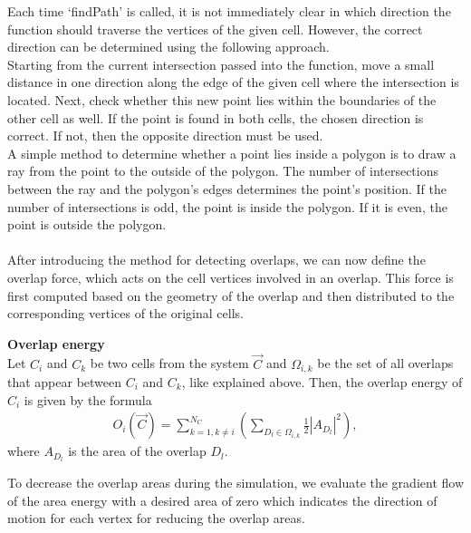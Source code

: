 Each time `findPath' is called, it is not immediately clear in which direction the function should traverse the vertices of the given cell. 
However, the correct direction can be determined using the following approach. \\
Starting from the current intersection passed into the function, move a small distance in one direction along the edge of the given cell where the intersection is located. Next, check whether this new point lies within the boundaries of the other cell as well. 
If the point is found in both cells, the chosen direction is correct. 
If not, then the opposite direction must be used. \\ 
A simple method to determine whether a point lies inside a polygon is to draw a ray from the point to the outside of the polygon. 
The number of intersections between the ray and the polygon's edges determines the point's position. 
If the number of intersections is odd, the point is inside the polygon.
If it is even, the point is outside the polygon. \\ 
\smallskip  \\
After introducing the method for detecting overlaps, we can now define the overlap force, which acts on the cell vertices involved in an overlap. 
This force is first computed based on the geometry of the overlap and then distributed to the corresponding vertices of the original cells. 

\begin{definition} \textbf{Overlap energy} \\
	Let $C_i$ and $C_k$ be two cells from the system $\vec{C}$ and $\Omega_{i,k}$ be the set of all overlaps that appear between $C_i$ and $C_k$, like explained above. Then, the overlap energy of $C_i$ is given by the formula 
	\begin{align}
		O_i(\vec{C}) = \sum\limits_{k=1, k \neq i}^{N_C} (\sum\limits_{D_l \in \Omega_{i,k}} \frac{1}{2}|A_{D_l}|^2),		
	\end{align} 
	where $A_{D_l}$ is the area of the overlap $D_l$.  \\
\end{definition}

To decrease the overlap areas during the simulation, we evaluate the gradient flow of the area energy with a desired area of zero which indicates the direction of motion for each vertex for reducing the overlap areas.


